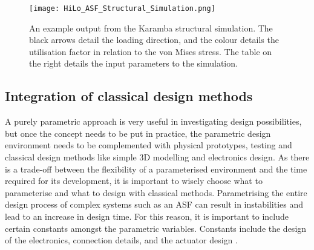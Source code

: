 \begin{figure}
\begin{center}
\texttt{[image: HiLo\_ASF\_Structural\_Simulation.png]}
\caption{An example output from the Karamba structural simulation. The black arrows detail the loading direction, and the colour details the utilisation factor in relation to the von Mises stress. The table on the right details the input parameters to the simulation.}
\label{fig:structureSettings}
\end{center}
\end{figure}




\subsection{Integration of classical design methods}

A purely parametric approach is very useful in investigating design possibilities, but once the concept needs to be put in practice, the parametric design environment needs to be complemented with physical prototypes, testing and classical design methods like simple 3D modelling and electronics design.
As there is a trade-off  between the  flexibility of a parameterised environment and the time required for its development, it is important to wisely choose what to parameterise and what to design with classical methods. Parametrising the entire design process of complex systems such as an ASF can result in instabilities and lead to an increase in design time. For this reason, it is important to include certain constants amongst the parametric variables. Constants include the design of the electronics, connection details, and the actuator design \cite{Svetozarevic2017a,svetozarevic2016soro}.


